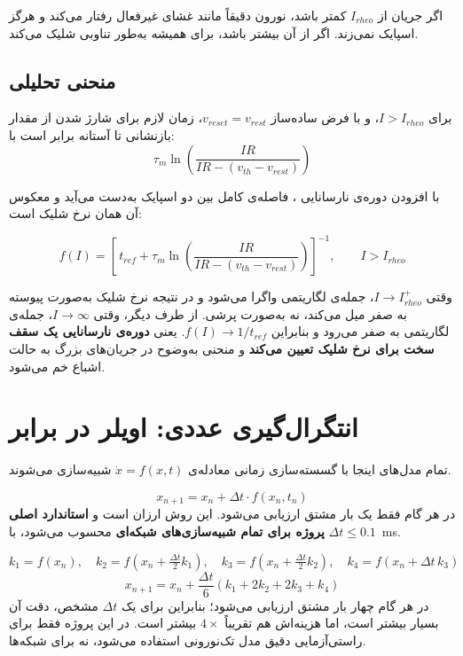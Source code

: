 \documentclass[11pt,a4paper]{article}
\begin{document}
اگر جریان از $I_{rheo}$ کمتر باشد، نورون دقیقاً مانند غشای غیرفعال رفتار می‌کند و هرگز اسپایک نمی‌زند. اگر از آن بیشتر باشد، برای همیشه به‌طور تناوبی شلیک می‌کند.

\subsection{منحنی تحلیلی }
برای $I > I_{rheo}$، و با فرض ساده‌ساز
$v_{reset}=v_{rest}$،
زمان لازم برای شارژ شدن از مقدار بازنشانی تا آستانه برابر است با:
$$\tau_m \ln\!\left(\dfrac{IR}{IR - (v_{th}-v_{rest})}\right)$$

با افزودن دوره‌ی نارسانایی ، فاصله‌ی کامل بین دو اسپایک  به‌دست می‌آید و معکوس آن همان نرخ شلیک است:

\begin{eqbox}
	$$f(I) = \left[\, t_{ref} + \tau_m \ln\!\left(\frac{IR}{IR - (v_{th}-v_{rest})}\right)\right]^{-1}, \qquad I > I_{rheo}$$
\end{eqbox}

\begin{keybox}
	وقتی $I \to I_{rheo}^+$، جمله‌ی لگاریتمی واگرا می‌شود و در نتیجه نرخ شلیک به‌صورت پیوسته به صفر میل می‌کند، نه به‌صورت پرشی. از طرف دیگر، وقتی $I \to \infty$، جمله‌ی لگاریتمی به صفر می‌رود و بنابراین
	$f(I) \to 1/t_{ref}$.
	یعنی \textbf{دوره‌ی نارسانایی یک سقف سخت برای نرخ شلیک تعیین می‌کند} و منحنی به‌وضوح در جریان‌های بزرگ به حالت اشباع خم می‌شود.
\end{keybox}

\section{انتگرال‌گیری عددی: اویلر در برابر }
تمام مدل‌های اینجا با گسسته‌سازی زمانی معادله‌ی
$\dot x = f(x,t)$
شبیه‌سازی می‌شوند.

\begin{eqbox}
	$$x_{n+1} = x_n + \Delta t \cdot f(x_n, t_n)$$
	در هر گام فقط یک بار مشتق ارزیابی می‌شود. این روش ارزان است و \textbf{استاندارد اصلی پروژه برای تمام شبیه‌سازی‌های شبکه‌ای} محسوب می‌شود، با
	$\Delta t \le 0.1$~ms.
\end{eqbox}

\begin{eqbox}
	$$k_1 = f(x_n),\quad k_2 = f(x_n+\tfrac{\Delta t}{2}k_1),\quad k_3 = f(x_n+\tfrac{\Delta t}{2}k_2),\quad k_4 = f(x_n+\Delta t\,k_3)$$
	$$x_{n+1} = x_n + \frac{\Delta t}{6}(k_1 + 2k_2 + 2k_3 + k_4)$$
	در هر گام چهار بار مشتق ارزیابی می‌شود؛ بنابراین برای یک $\Delta t$ مشخص، دقت آن بسیار بیشتر است، اما هزینه‌اش هم تقریباً $4\times$ بیشتر است. در این پروژه فقط برای راستی‌آزمایی دقیق مدل تک‌نورونی استفاده می‌شود، نه برای شبکه‌ها.
\end{eqbox}
\end{document}
